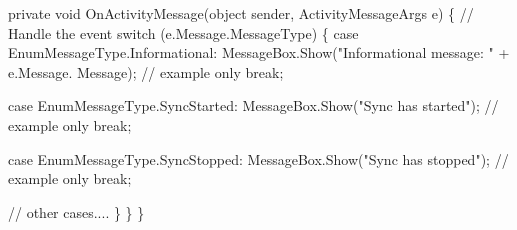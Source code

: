 \begin{DoxyCode}
          \textcolor{keyword}{private} \textcolor{keywordtype}{void} OnActivityMessage(\textcolor{keywordtype}{object} sender, ActivityMessageArgs e)
          \{
              \textcolor{comment}{// Handle the event}
              \textcolor{keywordflow}{switch} (e.Message.MessageType)
              \{
                  \textcolor{keywordflow}{case} EnumMessageType.Informational:
                      MessageBox.Show(\textcolor{stringliteral}{"Informational message: "} + e.Message.
      Message);  \textcolor{comment}{// example only}
                      \textcolor{keywordflow}{break};

                  \textcolor{keywordflow}{case} EnumMessageType.SyncStarted:
                      MessageBox.Show(\textcolor{stringliteral}{"Sync has started"});    \textcolor{comment}{// example only}
                      \textcolor{keywordflow}{break};

                  \textcolor{keywordflow}{case} EnumMessageType.SyncStopped:
                      MessageBox.Show(\textcolor{stringliteral}{"Sync has stopped"});    \textcolor{comment}{// example only}
                      \textcolor{keywordflow}{break};

                  \textcolor{comment}{// other cases....}
              \}
          \}
      \}
\end{DoxyCode}
 
